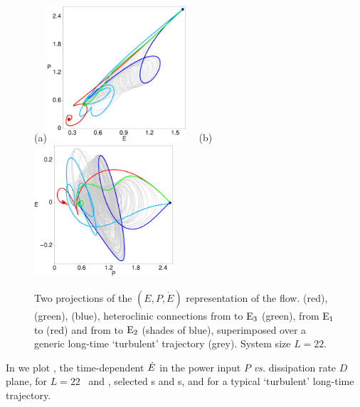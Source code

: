 \begin{figure}[t]
\begin{center}
(a)\!\!\!\!\includegraphics[width=0.46\textwidth]{figs/connEP.eps}%
~~(b)\!\!\!\!\includegraphics[width=0.46\textwidth]{figs/connPEdot.eps}
\end{center}
\caption{
Two projections of the $(E,P,\dot{E})$ representation of the flow.
 (red),  (green),  (blue),
heteroclinic connections from  to $\mathrm{E}_{3}$ (green),
from $\mathrm{E}_{1}$ to  (red)
and from  to $\mathrm{E}_{2}$ (shades of blue), superimposed over
a generic long-time `turbulent' trajectory (grey).
System size $L=22$.
        }
\label{f:drivedragConn}
\end{figure}

In  we plot , the time-dependent
$\dot{E}$ in the power input $P$ {\em vs.}
dissipation rate $D$
plane, for $L=22$ \eqva\ and \reqva,
selected \po s and \rpo s, and for a typical `turbulent' long-time
trajectory.


